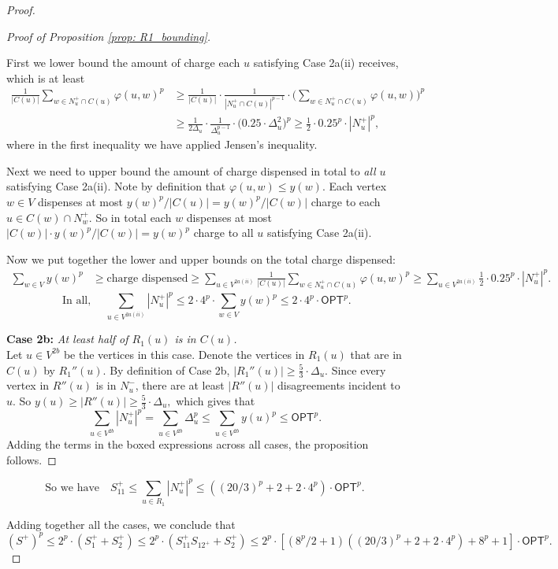 \documentclass[11pt]{article}
\begin{document}
\begin{proof}
\begin{proof}[Proof of Proposition \ref{prop: R1_bounding}]
\begin{itemize}
        First we lower bound the amount of charge each $u$ satisfying Case 2a(ii) receives, which is at least
        \begin{align*}
         \frac{1}{|C(u)|} \sum_{w \in N_u^+ \cap C(u)} \varphi(u,w)^p &\geq \frac{1}{|C(u)|} \cdot \frac{1}{|N_u^+ \cap C(u)|^{p-1}} \cdot \Big(\sum_{w \in N_u^+ \cap C(u)} \varphi(u,w) \Big)^p \\
         &\geq \frac{1}{2\Delta_u} \cdot \frac{1}{\Delta_u^{p-1}} \cdot \Big(0.25\cdot \Delta_u^2 \Big)^p 
         \geq \frac{1}{2} \cdot 0.25^p \cdot |N_u^+|^{p},
         \end{align*}
        where in the first inequality we have applied Jensen's inequality. 
    


    Next we need to upper bound the amount of charge dispensed in total to \textit{all} $u$ satisfying Case 2a(ii). Note by definition that $\varphi(u,w) \leq y(w)$. Each vertex $w \in V$ dispenses at most
    $y(w)^p/|C(u)| = y(w)^p/|C(w)|$
    charge to each $u \in C(w) \cap N_w^+$. So in total each $w$ dispenses at most 
    $|C(w)| \cdot y(w)^p/ |C(w)|  = y(w)^p$
    charge to all $u$ satisfying Case 2a(ii). 

    Now we put together the lower and upper bounds on the total charge dispensed:  
    \begin{align*}
        \sum_{w \in V} y(w)^p &\geq \text{charge dispensed} 
        \geq \sum_{u \in  V^{2a(ii)}} \frac{1}{|C(u)|} \sum_{w \in N_u^+ \cap C(u)} \varphi(u,w)^p 
        \geq \sum_{u \in  V^{2a(ii)}} \frac{1}{2} \cdot 0.25^p \cdot |N_u^+|^p.
    \end{align*}
    \[\text{  In all, } \quad \boxed{\sum_{u \in  V^{2a(ii)}} |N_u^+|^p \leq 2 \cdot 4^p \cdot \sum_{w \in V} y(w)^p \leq 2 \cdot 4^p \cdot \textsf{OPT}^p.}\]

    \end{itemize}

\noindent\textbf{Case 2b: }\emph{At least half of $R_1(u)$ is in $C(u)$.} \\
Let $ u \in  V^{2b}$ be the vertices in this case.
    Denote the vertices in $R_1(u)$ that are in $C(u)$ by $R_1''(u)$. By definition of Case 2b, $|R_1''(u)| \geq \frac{5}{3} \cdot \Delta_u$. Since every vertex in $R''(u)$ is in $N_u^-$, there are at least $|R''(u)|$ disagreements incident to $u$. So
    $y(u) \geq |R''(u)| \geq \frac{5}{3} \cdot \Delta_u,$
     which gives that
    \[ \boxed{\sum_{u \in V^{2b}} |N_u^+|^p = \sum_{u \in V^{2b}} \Delta_u^p \leq \sum_{u \in V^{2b}} y(u)^p \leq \textsf{OPT}^p.}\]
Adding the terms in the boxed expressions across all cases, the proposition follows. 
\end{proof} 
$$
\text{So we have} \quad 
\boxed{S_{11}^+ \leq \sum_{u \in R_1} |N_u^+|^p \leq \left((20/3)^p + 2 + 2 \cdot 4^p \right) \cdot \textsf{OPT}^p.}
$$

Adding together all the cases, we conclude that
$$
    (S^+)^p \leq 2^p \cdot (S_1^+ + S_2^+) 
    \leq 2^p \cdot (S_{11}^+ S_{12^+} + S_2^+) 
    \leq 2^p \cdot [(8^p/2 +1)((20/3)^p + 2 + 2 \cdot 4^p) + 8^p +1 ] \cdot \textsf{OPT}^p.
$$
\end{proof}
\end{document}
